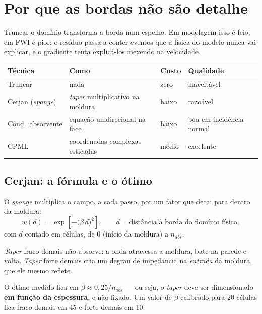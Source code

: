 \documentclass[11pt,a4paper,oneside]{report}
\begin{document}
\section{Por que as bordas n\~ao s\~ao detalhe}

Truncar o dom\'inio transforma a borda num espelho. Em modelagem isso \'e
feio; em FWI \'e pior: o res\'iduo passa a conter eventos que a f\'isica do
modelo nunca vai explicar, e o gradiente tenta explic\'a-los mexendo na
velocidade.

\begin{center}
\begin{tabular}{@{}lp{5.2cm}ll@{}}
\toprule
\textbf{T\'ecnica} & \textbf{Como} & \textbf{Custo} & \textbf{Qualidade} \\
\midrule
Truncar & nada & zero & inaceit\'avel \\
Cerjan (\emph{sponge}) & \emph{taper} multiplicativo na moldura & baixo
  & razo\'avel \\
Cond.\ absorvente & equa\c{c}\~ao unidirecional na face & baixo & boa em
  incid\^encia normal \\
CPML & coordenadas complexas esticadas & m\'edio & excelente \\
\bottomrule
\end{tabular}
\end{center}

\subsection*{Cerjan: a f\'ormula e o \'otimo}

O \emph{sponge} multiplica o campo, a cada passo, por um fator que decai para
dentro da moldura:
\begin{equation}
w(d) = \exp\!\left[-\bigl(\beta\, d\bigr)^{2}\right],
\qquad d = \text{dist\^ancia \`a borda do dom\'inio f\'isico},
\label{eq:cerjan}
\end{equation}
com $d$ contado em c\'elulas, de $0$ (in\'icio da moldura) a $n_{abs}$.

\begin{teoria}
\emph{Taper} fraco demais n\~ao absorve: a onda atravessa a moldura, bate na
parede e volta. \emph{Taper} forte demais cria um degrau de imped\^ancia na
\emph{entrada} da moldura, que ele mesmo reflete.

O \'otimo medido fica em $\beta \approx 0{,}25/n_{abs}$ --- ou seja, o
\emph{taper} deve ser dimensionado \textbf{em fun\c{c}\~ao da espessura}, e
n\~ao fixado. Um valor de $\beta$ calibrado para 20 c\'elulas fica fraco
demais em 45 e forte demais em 10.
\end{teoria}
\end{document}
